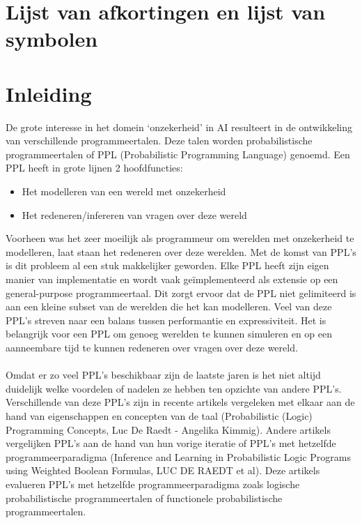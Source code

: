 \documentclass[12pt,a4paper,oneside]{book}
\begin{document}
\chapter{Lijst van afkortingen en lijst van symbolen}
\tableofcontents


\newpage
\mainmatter
\setcounter{page}{0}

\chapter{Inleiding}
De grote interesse in het domein ‘onzekerheid’ in AI resulteert in de ontwikkeling van verschillende programmeertalen. Deze talen worden probabilistische programmeertalen of PPL (Probabilistic Programming Language) genoemd. Een PPL heeft in grote lijnen 2 hoofdfuncties:
\begin{itemize}
  \item Het modelleren van een wereld met onzekerheid
  \item Het redeneren/infereren van vragen over deze wereld
\end{itemize}
Voorheen was het zeer moeilijk als programmeur om werelden met onzekerheid te modelleren, laat staan het redeneren over deze werelden. Met de komst van PPL’s is dit probleem al een stuk makkelijker geworden.
Elke PPL heeft zijn eigen manier van implementatie en wordt vaak geïmplementeerd als extensie op een general-purpose programmeertaal. Dit zorgt ervoor dat de PPL niet gelimiteerd is aan een kleine subset van de werelden die het kan modelleren. Veel van deze PPL’s streven naar een balans tussen performantie en expressiviteit. Het is belangrijk voor een PPL om genoeg werelden te kunnen simuleren en op een aanneembare tijd te kunnen redeneren over vragen over deze wereld.
\\\\
Omdat er zo veel PPL’s beschikbaar zijn de laatste jaren is het niet altijd duidelijk welke voordelen of nadelen ze hebben ten opzichte van andere PPL’s. Verschillende van deze PPL’s zijn in recente artikels vergeleken met elkaar aan de hand van eigenschappen en concepten van de taal (Probabilistic (Logic) Programming Concepts, Luc De Raedt - Angelika Kimmig). Andere artikels vergelijken PPL’s aan de hand van hun vorige iteratie of PPL’s met hetzelfde programmeerparadigma (Inference and Learning in Probabilistic Logic Programs using Weighted Boolean Formulas, LUC DE RAEDT et al). Deze artikels evalueren PPL’s met hetzelfde programmeerparadigma zoals logische probabilistische programmeertalen of functionele probabilistische programmeertalen.
\end{document}
